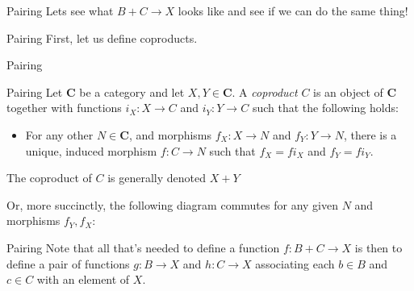 \documentclass[tikz]{beamer}
\theoremstyle{definition}
\newcommand{\cat}[1]{\mathbf{#1}}
\begin{document}
\begin{frame}{Pairing}
    Lets see what $B + C \to X$ looks like and see if we can do the same thing!
\end{frame}{}

\begin{frame}{Pairing}
    First, let us define coproducts.
\end{frame}{}

\begin{frame}{Pairing}
    \begin{definition}{Pairing}
        Let $\cat{C}$ be a category and let $X, Y \in \cat{C}$. A \textit{coproduct} $C$ is an object of $\cat{C}$ together with functions $i_X : X \to C$ and $i_Y: Y \to C$ such that the following holds:

        \begin{itemize}
            \item For any other $N \in \cat{C}$, and morphisms $f_X: X \to N$ and $f_Y: Y \to N$, there is a unique, induced morphism $f: C \to N$ such that $f_X = fi_X$ and $f_Y = fi_Y$.
        \end{itemize}{}
    \end{definition}{}

    The coproduct of $C$ is generally denoted $X + Y$
\end{frame}{}

\begin{frame}[fragile]
    Or, more succinctly, the following diagram commutes for any given $N$ and morphisms $f_Y, f_X$:

\begin{center}
    {}
\end{center}{}

\end{frame}

\begin{frame}{Pairing}
    Note that all that's needed to define a function $f: B + C \to X$ is then to define a pair of functions $g: B \to X$ and $h: C \to X$ associating each $b \in B$ and $c \in C$ with an element of $X$.

\end{frame}
\end{document}
